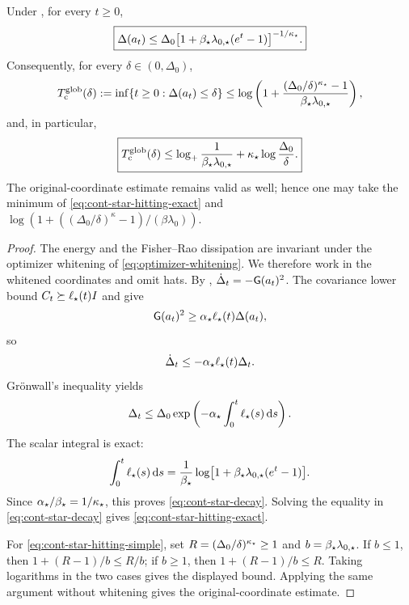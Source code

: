 \begin{theorem}
\label{thm:cont-global}
Under , for every $t\geq0$,
\begin{equation}
\label{eq:cont-star-decay}
    \boxed{
    \Delta(a_t)
    \leq
    \Delta_0
    \bigl[1+\beta_\star\lambda_{0,\star}(e^t-1)\bigr]^{-1/\kappa_\star}.}
\end{equation}
Consequently, for every $\delta\in(0,\Delta_0)$,
\begin{equation}
\label{eq:cont-star-hitting-exact}
    T_{\mathrm c}^{\mathrm{glob}}(\delta)
    :=\inf\{t\geq0:\Delta(a_t)\leq\delta\}
    \leq
    \log\left(
        1+
        \frac{(\Delta_0/\delta)^{\kappa_\star}-1}
             {\beta_\star\lambda_{0,\star}}
    \right),
\end{equation}
and, in particular,
\begin{equation}
\label{eq:cont-star-hitting-simple}
    \boxed{
    T_{\mathrm c}^{\mathrm{glob}}(\delta)
    \leq
    \log_+\frac1{\beta_\star\lambda_{0,\star}}
    +\kappa_\star\log\frac{\Delta_0}{\delta}.}
\end{equation}
The original-coordinate estimate remains valid as well; hence one may take the minimum of
\eqref{eq:cont-star-hitting-exact} and
$\log(1+((\Delta_0/\delta)^\kappa-1)/(\beta\lambda_0))$.
\end{theorem}

\begin{proof}
The energy and the Fisher--Rao dissipation are invariant under the optimizer whitening of
\eqref{eq:optimizer-whitening}.  We therefore work in the whitened coordinates and omit hats.
By ,
$\dot\Delta_t=-\mathsf{G}(a_t)^2$.  The covariance lower bound
$C_t\succeq\ell_\star(t)I$ and  give
\[
    \mathsf{G}(a_t)^2
    \geq
    \alpha_\star\ell_\star(t)\Delta(a_t),
\]
so
\[
    \dot\Delta_t
    \leq
    -\alpha_\star\ell_\star(t)\Delta_t.
\]
Gr\"onwall's inequality yields
\[
    \Delta_t
    \leq
    \Delta_0
    \exp\left(-\alpha_\star\int_0^t\ell_\star(s)\,\mathrm{d} s\right).
\]
The scalar integral is exact:
\[
    \int_0^t\ell_\star(s)\,\mathrm{d} s
    =\frac1{\beta_\star}
      \log\bigl[1+\beta_\star\lambda_{0,\star}(e^t-1)\bigr].
\]
Since $\alpha_\star/\beta_\star=1/\kappa_\star$, this proves
\eqref{eq:cont-star-decay}.  Solving the equality in \eqref{eq:cont-star-decay} gives
\eqref{eq:cont-star-hitting-exact}.

For \eqref{eq:cont-star-hitting-simple}, set
$R=(\Delta_0/\delta)^{\kappa_\star}\geq1$ and
$b=\beta_\star\lambda_{0,\star}$.  If $b\leq1$, then
$1+(R-1)/b\leq R/b$; if $b\geq1$, then
$1+(R-1)/b\leq R$.  Taking logarithms in the two cases gives the displayed bound.  Applying the
same argument without whitening gives the original-coordinate estimate.
\end{proof}

